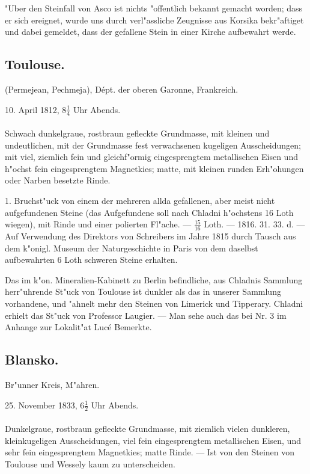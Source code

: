 \documentclass[a4paper, 11pt, oneside, polutonikogreek, german]{article}
\begin{document}
"Uber den Steinfall von Asco ist nichts "offentlich bekannt gemacht worden; dass er sich ereignet, wurde uns durch verl"assliche Zeugnisse aus Korsika bekr"aftiget und dabei gemeldet, dass der gefallene Stein in einer Kirche aufbewahrt werde.
\subsection{Toulouse.}
\begin{center}
\small
(Permejean, Pechmeja), Dépt. der oberen Garonne, Frankreich.

10. April 1812, $8\frac{1}{4}$ Uhr Abends.
\end{center}
\paragraph{}
Schwach dunkelgraue, rostbraun gefleckte Grundmasse, mit kleinen und undeutlichen, mit der Grundmasse fest verwachsenen kugeligen Ausscheidungen; mit viel, ziemlich fein und gleichf"ormig eingesprengtem metallischen Eisen und h"ochst fein eingesprengtem Magnetkies; matte, mit kleinen runden Erh"ohungen oder Narben besetzte Rinde.

1. Bruchst"uck von einem der mehreren allda gefallenen, aber meist nicht aufgefundenen Steine (das Aufgefundene soll nach Chladni h"ochstens 16 Loth wiegen), mit Rinde und einer polierten Fl"ache. --- $\frac{15}{16}$ Loth. --- 1816. 31. 33. d. --- Auf Verwendung des Direktors von Schreibers im Jahre 1815 durch Tausch aus dem k"onigl. Museum der Naturgeschichte in Paris von dem daselbst aufbewahrten 6 Loth schweren Steine erhalten.

Das im k"on. Mineralien-Kabinett zu Berlin befindliche, aus Chladnis Sammlung herr"uhrende St"uck von Toulouse ist dunkler als das in unserer Sammlung vorhandene, und "ahnelt mehr den Steinen von Limerick und Tipperary. Chladni erhielt das St"uck von Professor Laugier. --- Man sehe auch das bei Nr. 3 im Anhange zur Lokalit"at Lucé Bemerkte.
\subsection{Blansko.}
\begin{center}
\small
Br"unner Kreis, M"ahren.

25. November 1833, $6\frac{1}{2}$ Uhr Abends.
\end{center}
\paragraph{}
Dunkelgraue, rostbraun gefleckte Grundmasse, mit ziemlich vielen dunkleren, kleinkugeligen Ausscheidungen, viel fein eingesprengtem metallischen Eisen, und sehr fein eingesprengtem Magnetkies; matte Rinde. --- Ist von den Steinen von Toulouse und Wessely kaum zu unterscheiden.
\end{document}
